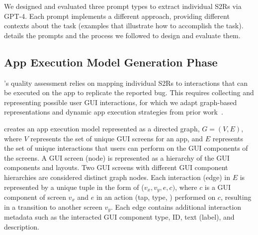 We designed and evaluated three prompt types to extract individual S2Rs via GPT-4. 
Each prompt implements a different approach, providing different contexts about the task (\eg examples that illustrate how to accomplish the task). 
 details the prompts and the process we followed to design and evaluate them.
 
\subsection{App Execution Model Generation Phase}
\label{sec:execution-model}

\tool's quality assessment relies on mapping individual S2Rs to interactions that can be executed on the app to replicate the reported bug. 
This requires collecting and representing possible user GUI interactions, for which we adapt graph-based representations and dynamic app execution strategies from prior work~\cite{song2022toward,saha2024toward}.

\tool creates an app execution model represented as a directed graph, $G = (V, E)$, where $V$ represents the set of unique GUI screens for an app, and $E$ represents the set of unique interactions that users can perform on the GUI components of the screens. 
A GUI screen (\ie node) is represented as a hierarchy of the GUI components and layouts. 
Two GUI screens with different GUI component hierarchies are considered distinct graph nodes. 
Each interaction (\ie edge) in $E$ is represented by a unique tuple in the form of ($v_x, v_y, e, c)$, where $c$ is a GUI component of screen $v_x$ and  $e$ in an action (tap, type, \etc) performed on $c$, resulting in a transition to another screen $v_y$. 
Each edge contains additional interaction metadata such as the interacted GUI component type, ID, text (\ie label), and description. 

